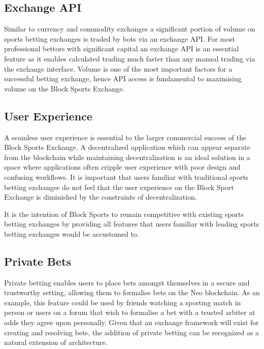\documentclass{article}
\begin{document}
	\subsection{Exchange API}
Similar to currency and commodity exchanges a significant portion of volume on sports betting exchanges is traded by bots via an exchange API. For most professional bettors with significant capital an exchange API is an essential feature as it enables calculated trading much faster than any manual trading via the exchange interface. Volume is one of the most important factors for a successful betting exchange, hence API access is fundamental to maximising volume on the Block Sports Exchange.	

	\subsection{User Experience}
A seamless user experience is essential to the larger commercial success of the Block Sports Exchange. A decentralized application which can appear separate from the blockchain while maintaining decentralization is an ideal solution in a space where applications often cripple user experience with poor design and confusing workflows. It is important that users familiar with traditional sports betting exchanges do not feel that the user experience on the Block Sport Exchange is diminished by the constraints of decentralization. 

It is the intention of Block Sports to remain competitive with existing sports betting exchanges by providing all features that users familiar with leading sports betting exchanges would be accustomed to.

	\subsection{Private Bets}
Private betting enables users to place bets amongst themselves in a secure and trustworthy setting, allowing them to formalise bets on the Neo blockchain. As an example, this feature could be used by friends watching a sporting match in person or users on a forum that wish to formalise a bet with a trusted arbiter at odds they agree upon personally. Given that an exchange framework will exist for creating and resolving bets, the addition of private betting can be recognized as a natural extension of architecture.
\end{document}
